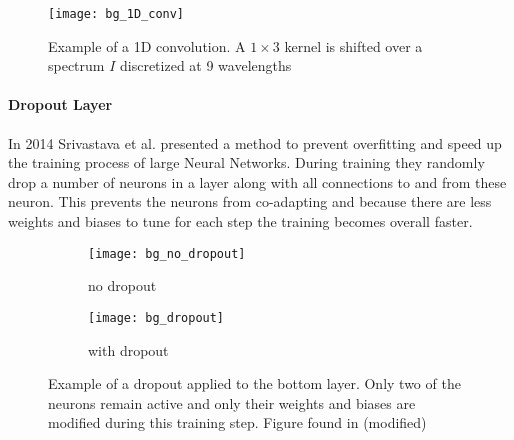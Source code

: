 \begin{figure}[H]
    \centering
    \texttt{[image: bg\_1D\_conv]}
    \caption{Example of a 1D convolution. A $1 \times 3$ kernel is shifted over a spectrum $I$ discretized at 9 wavelengths}
    \label{fig:bg:1D_conv}
\end{figure}

\paragraph{Dropout Layer}
In 2014 Srivastava et al.\cite{Srivastava2014} presented a method to prevent overfitting and speed up the training process of large Neural Networks. During training they randomly drop a number of neurons in a layer along with all connections to and from these neuron. This prevents the neurons from co-adapting  and because there are less weights and biases to tune for each step the training becomes overall faster.
\\

\begin{figure}[H]
\centering
\begin{subfigure}{.5\textwidth}
    \centering
    \texttt{[image: bg\_no\_dropout]}
    \caption{no dropout}
    \label{}
\end{subfigure}%
\begin{subfigure}{.5\textwidth}
    \centering
    \texttt{[image: bg\_dropout]}
    \caption{with dropout}
    \label{}
\end{subfigure}
\caption{Example of a dropout applied to the bottom layer. Only two of the neurons remain active and only their weights and biases are modified during this training step. Figure found in \cite{Srivastava2014} (modified)}
\label{}
\end{figure}
